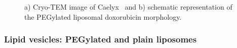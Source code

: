 \begin{figure}
	\centering
		\caption[Cryo-TEM image and schematic representation of Caelyx.]{a) Cryo-TEM image of Caelyx\textregistered\ \citep{barenholz_doxil-first_2012} and b) schematic representation of the PEGylated liposomal doxorubicin morphology.}
\end{figure}


%		

\subsubsection{Lipid vesicles: PEGylated and plain liposomes}
\label{sec:materials_liposome}

